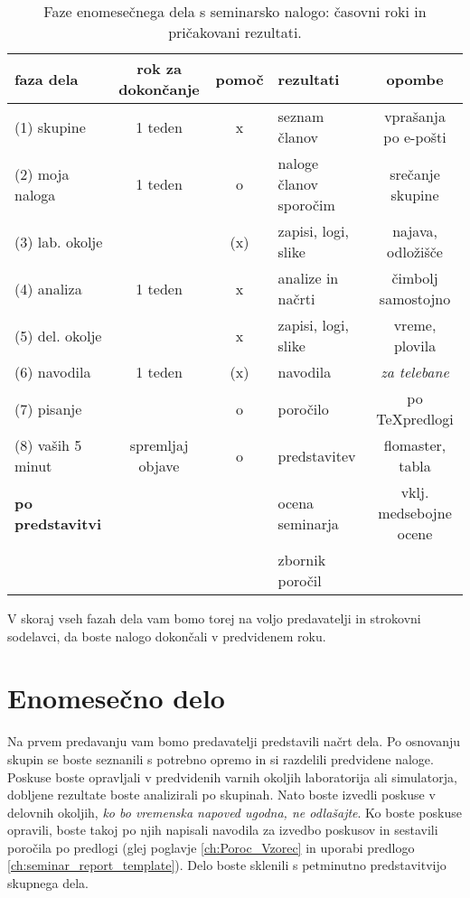 \begin{table}[!htbp] 
	\caption{Faze enomesečnega dela s seminarsko nalogo: časovni roki in pričakovani rezultati.}
	\vspace{2mm}
	\begin{center}
		{\small
			\begin{tabular}{l||c|c|l|c}\hline
			faza dela	   & rok za dokončanje & pomoč & rezultati 			     & opombe \\ \hline \hline
			(1) skupine    & 1 teden           & x     & seznam članov           & vprašanja po e-pošti\\ \hline
			(2) moja naloga& 1 teden           & o     & naloge članov sporočim & srečanje skupine\\ \hline
			(3) lab. okolje&                   & (x)   & zapisi, logi, slike     & najava, odložišče \\ \hline
			(4) analiza	   & 1 teden           & x     & analize in načrti    	 & čimbolj samostojno\\ \hline
			(5) del. okolje&                   & x     & zapisi, logi, slike     & vreme, plovila  \\ \hline
			(6) navodila   & 1 teden           & (x)   & navodila                &\textit{za telebane}\\ \hline
			(7) pisanje	   &                   & o     & poročilo                & po \TeX predlogi \\ \hline
			(8) vaših 5 minut& spremljaj objave& o     & predstavitev            & flomaster, tabla \\ \hline
			\textbf{po predstavitvi}&          &       & ocena seminarja         & vklj. medsebojne ocene\\ \hline
				            &                  &       & zbornik poročil         &      \\ \hline
			\end{tabular}
		}
	\end{center}
	\label{tab:faze_dela}
\end{table}

V skoraj vseh fazah dela vam bomo torej na voljo predavatelji in strokovni sodelavci, da boste nalogo dokončali v predvidenem roku.

\section{Enomesečno delo}
\label{sec:OpisDela}

Na prvem predavanju vam bomo predavatelji predstavili načrt dela. Po osnovanju skupin se boste seznanili s potrebno opremo in si razdelili predvidene naloge. Poskuse boste opravljali v predvidenih varnih okoljih laboratorija ali simulatorja, dobljene rezultate boste analizirali po skupinah. Nato boste izvedli poskuse v delovnih okoljih, \textit{ko bo vremenska napoved ugodna, ne odlašajte}. Ko boste poskuse opravili, boste takoj po njih napisali navodila za izvedbo poskusov in sestavili poročila po predlogi (glej poglavje \ref{ch:Poroc_Vzorec} in uporabi predlogo \ref{ch:seminar_report_template}). Delo boste sklenili s petminutno predstavitvijo skupnega dela.     

